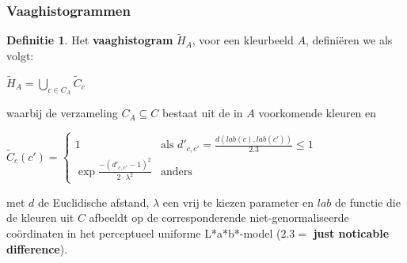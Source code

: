 \documentclass[dutch]{beamer}
\theoremstyle{definition}
\newtheorem{definitie}[theorem]{Definitie}
\theoremstyle{remark}
\theoremstyle{example}
\begin{document}
{
  \frametitle{Vaaghistogrammen}
  
  \begin{definitie}
  Het \textbf{vaaghistogram} $\widetilde{H}_A$, voor een kleurbeeld $A$, defini\"eren we 
  als volgt:
  \begin{minipage}{\textwidth}
  \centering 
  $\widetilde{H}_A = \displaystyle\bigcup_{c \in C_A} \widetilde{C}_c$
  \vspace{4pt}
  \end{minipage} 
  waarbij de verzameling $C_A \subseteq C$ bestaat uit de in $A$ voorkomende kleuren en
  \begin{minipage}{\textwidth}
  \scriptsize
  \centering
  $\widetilde{C}_c(c') =
  \begin{cases}
  1 & \text{als } d'_{c,c'} = \frac{d \left( lab(c), lab(c') \right)}{2.3} \leq 1 \\ 
  \exp \frac{- \left( d'_{c,c'} - 1 \right)^2}{2 \cdot \lambda^2} & \text{anders}
  \end{cases}$
  \vspace{4pt}
  \end{minipage}
  met $d$ de Euclidische afstand, $\lambda$ een vrij te kiezen parameter en $lab$ de 
  functie die de kleuren uit $C$ afbeeldt op de corresponderende niet-genormaliseerde 
  co\"ordinaten in het perceptueel uniforme L*a*b*-model 
  ($2.3 =$ \textbf{just noticable difference}).
  \end{definitie}
}
\frame
\end{document}
